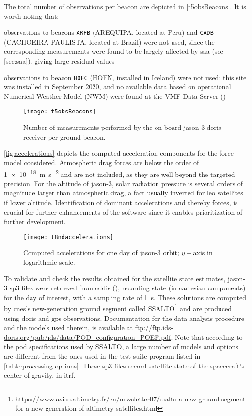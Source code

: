 The total number of observations per beacon are depicted in \autoref{t5obsBeacons}. 
It is worth noting that:
\begin{description}
  \item observations to beacons \texttt{ARFB} (AREQUIPA, located at Peru) and 
    \texttt{CADB} (CACHOEIRA PAULISTA, located at Brazil) were not used, 
    since the corresponding measurements were found to be largely affected by 
    \gls{saa} (see \autoref{sec:saa}), giving large residual values
  \item observations to beacon \texttt{HOFC} (HOFN, installed in Iceland) were not used; this site was installed in 
    September 2020, and no available data based on operational Numerical Weather Model (NWM) 
    were found at the VMF Data Server (\cite{vmf3DataServer})
\end{description}
\begin{figure}[ht]
    \centering
    \texttt{[image: t5obsBeacons]}
    \caption{Number of measurements performed by the on-board \gls{jason}-3 \gls{doris} receiver per ground beacon.}
    \label{fig:obsPerBeacon}
\end{figure}

\autoref{fig:accelerations} depicts the computed acceleration components for the 
force model considered. Atmospheric drag forces are below the order of \SI{1e-18}{\meter\per\second\squared} 
and are not included, as they are well beyond the targeted precision. For the altitude 
of \gls{jason}-3, solar radiation pressure is several orders of magnitude larger than 
atmospheric drag, a fact usually inverted for \gls{leo} satellites if lower 
altitude. Identification of dominant accelerations and thereby forces, is crucial 
for further enhancements of the software since it enables prioritization of further 
development.

\begin{figure}[ht]
    \centering
    \texttt{[image: t8ndaccelerations]}
    \caption{Computed accelerations for one day of \gls{jason}-3 orbit; $y-$axis in logarithmic scale.}
    \label{fig:accelerations}
\end{figure}

To validate and check the results obtained for the satellite state estimates, 
\gls{jason}-3 sp3 files were retrieved from \gls{cddis} (\cite{Noll2010}), recording 
state (in cartesian components) for the day of interest, with a sampling rate of 
\SI{1}{\second}. These solutions are computed by \gls{cnes}'s new-generation ground segment 
called SSALTO\footnote{https://www.aviso.altimetry.fr/en/newsletter07/ssalto-a-new-ground-segment-for-a-new-generation-of-altimetry-satellites.html} 
and are produced using \gls{doris} and \gls{gps} observations. Documentation 
for the data analysis procedure and the models used therein, is available at 
\url{ftp://ftp.ids-doris.org/pub/ids/data/POD_configuration_POEF.pdf}. Note that 
according to the \gls{pod} specifications used by SSALTO, a large number of models 
and options are different from the ones used in the test-suite program listed in 
\autoref{table:processing-options}. These sp3 files record satellite state of the 
spacecraft's center of gravity, in \gls{itrf}.

